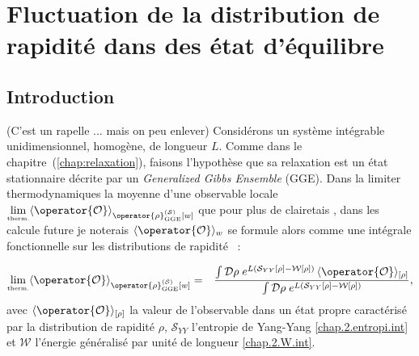 \chapter{Fluctuation de la distribution de rapidité dans des état d'équilibre} 
\minitoc

\section*{Introduction}

{\color{blue} {\color{red}(C'est un rapelle ... mais on peu enlever)}
Considérons un système intégrable unidimensionnel, homogène, de longueur \(L\). Comme dans le chapitre~(\ref{chap:relaxation}), faisons l'hypothèse que sa relaxation est un état stationnaire décrite par un \textit{Generalized Gibbs Ensemble} (GGE). Dans la limiter thermodynamiques la moyenne d’une observable locale $\underset{\mbox{\tiny therm.}}{\lim}\langle \operator{\mathcal{O}} \rangle_{\operator{\rho}_{\mathrm{GGE}}^{(\mathcal{S})}[w]}$ que pour plus de clairetais , dans les calcule future je noterais \(\langle\operator{\mathcal{O}}\rangle_w\) se formule alors comme une intégrale fonctionnelle sur les distributions de rapidité~\cite{YangYang1969} :

\begin{eqnarray}
	\underset{\mbox{\tiny therm.}}{\lim}\langle \operator{\mathcal{O}} \rangle_{\operator{\rho}_{\mathrm{GGE}}^{(\mathcal{S})}[w]} & = & \frac{\int \mathcal{D} \rho \; e^{L (\mathcal{S}_{YY}[\rho] - \mathcal{W}[\rho])} \, \langle\operator{\mathcal{O}} \rangle_{[\rho]}}{\int \mathcal{D} \rho \; e^{L (\mathcal{S}_{YY}[\rho] - \mathcal{W}[\rho])}}, \label{chap:fluctu:eq:ensemble_average}
\end{eqnarray}
avec $\langle\operator{\mathcal{O}} \rangle_{[\rho]}$ la valeur de l’observable dans un état propre caractérisé par la distribution de rapidité $\rho$, $\mathcal{S}_{YY}$ l'entropie de Yang-Yang \eqref{chap.2.entropi.int} et $\mathcal{W}$ l'énergie généralisé par unité de longueur \eqref{chap.2.W.int}.

}
